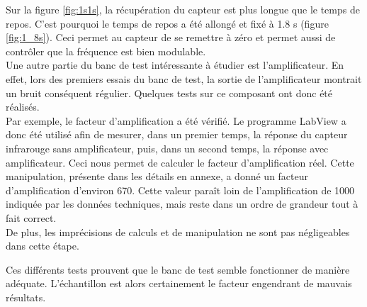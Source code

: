 Sur la figure \ref{fig:1s1s}, la récupération du capteur est plus longue que le temps de repos. C'est pourquoi le temps de repos a été allongé
et fixé à 1.8 s (figure \ref*{fig:1_8s}). Ceci permet au capteur de se remettre à zéro et permet aussi de contrôler que la fréquence est bien
modulable. \\

Une autre partie du banc de test intéressante à étudier est l'amplificateur. En effet, lors des premiers essais du banc de test, la sortie de 
l'amplificateur montrait un bruit conséquent régulier. Quelques tests sur ce composant ont donc été réalisés. \\
Par exemple, le facteur d'amplification a été vérifié. Le programme LabView a donc été utilisé afin de mesurer, dans un
premier temps, la réponse du capteur \gls{infrarouge} sans amplificateur, puis, dans un second temps, la réponse avec amplificateur. Ceci nous
permet de calculer le facteur d'amplification réel. Cette manipulation, présente dans les détails en annexe, a donné un facteur d'amplification 
d'environ 670. Cette valeur paraît loin de l'amplification de 1000 indiquée par les données techniques, mais reste dans un ordre de grandeur 
tout à fait correct. \\
De plus, les imprécisions de calculs et de manipulation ne sont pas négligeables dans cette étape. 

Ces différents tests prouvent que le banc de test semble fonctionner de manière adéquate. L'échantillon est alors certainement le facteur engendrant de
mauvais résultats. 

